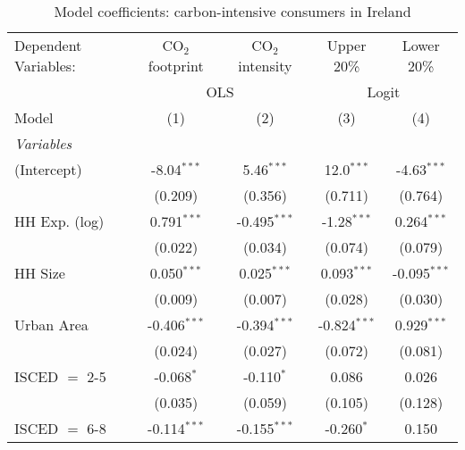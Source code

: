 
\begin{table}[htbp!]
   \centering
   \small
   \begin{adjustbox}{width = 1\textwidth, max height = 0.95\textheight, center}
      \begin{threeparttable}[b]
         \caption{\label{tab:Logit_1_IRL} Model coefficients: carbon-intensive consumers in Ireland}
         \begin{tabular}{lcccc}
            \tabularnewline \midrule \midrule
            Dependent Variables: & CO$_{2}$ footprint & CO$_{2}$ intensity & Upper 20\%     & Lower 20\%\\   
             & \multicolumn{2}{c}{OLS} & \multicolumn{2}{c}{Logit} \\ 
            Model                & (1)                & (2)                & (3)            & (4)\\  
            \midrule
            \emph{Variables}\\
            (Intercept)          & -8.04$^{***}$      & 5.46$^{***}$       & 12.0$^{***}$   & -4.63$^{***}$\\   
                                 & (0.209)            & (0.356)            & (0.711)        & (0.764)\\   
            HH Exp. (log)        & 0.791$^{***}$      & -0.495$^{***}$     & -1.28$^{***}$  & 0.264$^{***}$\\   
                                 & (0.022)            & (0.034)            & (0.074)        & (0.079)\\   
            HH Size              & 0.050$^{***}$      & 0.025$^{***}$      & 0.093$^{***}$  & -0.095$^{***}$\\   
                                 & (0.009)            & (0.007)            & (0.028)        & (0.030)\\   
            Urban Area           & -0.406$^{***}$     & -0.394$^{***}$     & -0.824$^{***}$ & 0.929$^{***}$\\   
                                 & (0.024)            & (0.027)            & (0.072)        & (0.081)\\   
            ISCED $=$ 2-5        & -0.068$^{*}$       & -0.110$^{*}$       & 0.086          & 0.026\\   
                                 & (0.035)            & (0.059)            & (0.105)        & (0.128)\\   
            ISCED $=$ 6-8        & -0.114$^{***}$     & -0.155$^{***}$     & -0.260$^{*}$   & 0.150\\   

\end{tabular}
\end{threeparttable}
\end{adjustbox}
\end{table}
